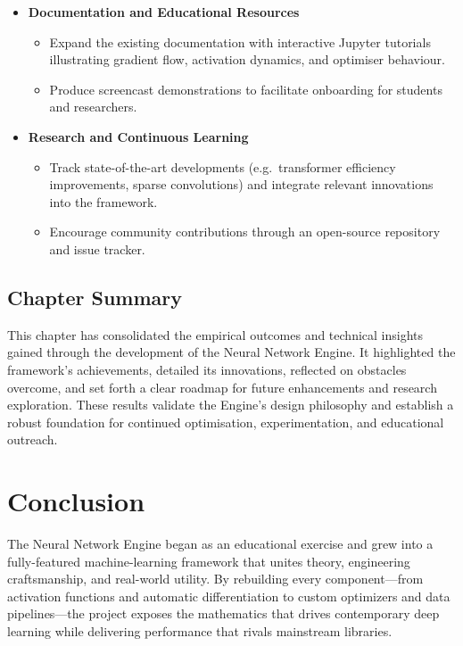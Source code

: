 \documentclass[11pt,a4paper]{report}
\begin{document}
\begin{itemize}
    \item \textbf{Documentation and Educational Resources}
          \begin{itemize}
              \item Expand the existing documentation with interactive Jupyter tutorials illustrating gradient flow, activation dynamics, and optimiser behaviour.
              \item Produce screencast demonstrations to facilitate onboarding for students and researchers.
          \end{itemize}
    \item \textbf{Research and Continuous Learning}
          \begin{itemize}
              \item Track state-of-the-art developments (e.g.\ transformer efficiency improvements, sparse convolutions) and integrate relevant innovations into the framework.
              \item Encourage community contributions through an open-source repository and issue tracker.
          \end{itemize}
\end{itemize}

\section*{Chapter Summary}

This chapter has consolidated the empirical outcomes and technical insights gained through the development of the Neural Network Engine.  It highlighted the framework’s achievements, detailed its innovations, reflected on obstacles overcome, and set forth a clear roadmap for future enhancements and research exploration.  These results validate the Engine’s design philosophy and establish a robust foundation for continued optimisation, experimentation, and educational outreach.

\chapter{Conclusion}

The Neural Network Engine began as an educational exercise and grew into a fully-featured machine-learning framework that unites theory, engineering craftsmanship, and real-world utility. By rebuilding every component—from activation functions and automatic differentiation to custom optimizers and data pipelines—the project exposes the mathematics that drives contemporary deep learning while delivering performance that rivals mainstream libraries.
\end{document}
